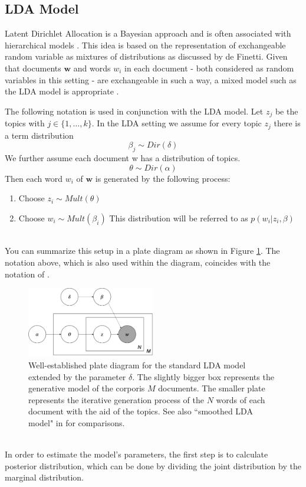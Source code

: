 \documentclass[11pt,a4paper]{article}
\begin{document}
\subsection{LDA Model}\label{sec:LDA}

Latent Dirichlet Allocation is a Bayesian approach and is often associated with hierarchical models \cite{Gelman2014}. This idea is based on the representation of exchangeable random variable as mixtures of distributions as discussed by de Finetti.  Given that documents $\textbf{w}$ and words $w_i$ in each document - both considered as random variables in this setting - are exchangeable in such a way, a mixed model such as the LDA model is appropriate \cite{Blei2003}.

The following notation is used in conjunction with the LDA model. Let $z_j$ be the topics with $j\in\{1,\dots,k\}$. In the LDA setting we assume for  every topic $z_j$ there is a term distribution
$$\beta_j \sim Dir(\delta)$$
We further assume each document w has a distribution of topics.
$$\theta \sim Dir(\alpha)$$
Then each word $w_i$ of $\textbf{w}$ is generated by the following process:

\begin{enumerate}
	\item Choose $z_i \sim Mult(\theta)$
	
	\item Choose $w_i \sim Mult(\beta_i)$ This distribution will be referred to as $p(w_i|z_i,\beta)$
\end{enumerate}
\ \\
You can summarize this setup in a plate diagram as shown in Figure \ref{fig:PlateDiagram}. The notation above, which is also used within the diagram, coincides with the notation of \cite{Hornik2011}.\\


\begin{figure}[h]
	\centering
	\includegraphics[width=0.5\textwidth]{LDA_Plate_Diagram.png}
	\caption{Well-established plate diagram for the standard LDA model extended by the parameter $\delta$. The slightly bigger box represents the generative model of the corporis $M$ documents. The smaller plate represents the iterative generation process of the $N$ words of each document with the aid of the topics. See also ``smoothed LDA model" in \cite{Blei2003}  for comparisons.}
	\label{fig:PlateDiagram}
\end{figure}
\ \\
In order to estimate the model's parameters, the first step is to calculate posterior distribution, which can be done by dividing the joint distribution by the marginal distribution.
\end{document}
